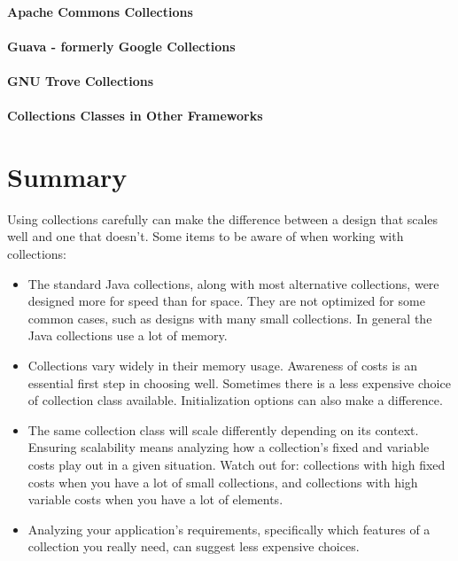 \paragraph{Apache Commons Collections}

\paragraph{Guava - formerly Google Collections}

\paragraph{GNU Trove Collections}

\paragraph{Collections Classes in Other Frameworks}

\section{Summary}
Using collections carefully can
make the difference between a design that scales well and one that
doesn't. Some items to be aware of when working with collections:
\begin{itemize}
  \item The standard Java collections, along with most alternative
  collections, were designed more for speed than for space. They are
  not optimized for some common cases, such as designs with many small
  collections. In general the Java collections use a lot of memory.
  \item Collections vary widely in their memory usage. Awareness of
  costs is an essential first step in choosing well. Sometimes there is a less
  expensive choice of collection class available. Initialization options
  can also make a difference.
  \item The same collection class will scale differently depending on its
  context. Ensuring scalability means
  analyzing how a collection's fixed and variable costs
  play out in a given situation. Watch out for: collections with
  high fixed costs when you have a lot of small collections, and 
  collections with high variable costs when you have a
  lot of elements.
  \item Analyzing your application's requirements, specifically
  which features of a collection you really need, can suggest
  less expensive choices.
\end{itemize}
